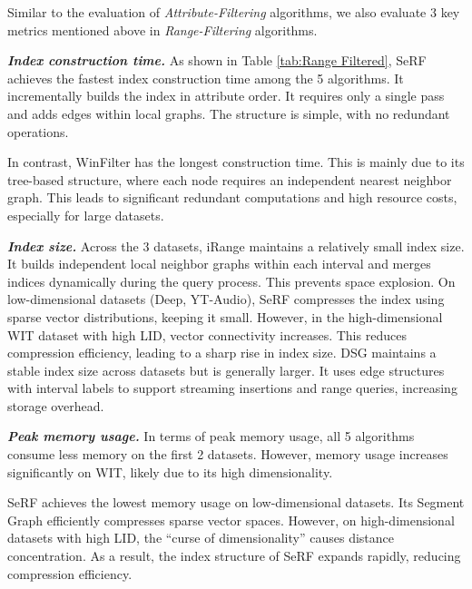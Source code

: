 \documentclass[sigconf, nonacm]{acmart}
\begin{document}
	
	Similar to the evaluation of \textit{Attribute-Filtering} algorithms, we also evaluate 3 key metrics mentioned above in \textit{Range-Filtering} algorithms.
	
	\textit{\textbf{Index construction time.}}
	As shown in Table \ref{tab:Range Filtered}, SeRF achieves the fastest index construction time among the 5 algorithms. It incrementally builds the index in attribute order. It requires only a single pass and adds edges within local graphs. The structure is simple, with no redundant operations.
	
	In contrast, WinFilter has the longest construction time. This is mainly due to its tree-based structure, where each node requires an independent nearest neighbor graph. This leads to significant redundant computations and high resource costs, especially for large datasets.
	
	
	
	
	
	
	\textit{\textbf{Index size.}} Across the 3 datasets, iRange maintains a relatively small index size. It builds independent local neighbor graphs within each interval and merges indices dynamically during the query process. This prevents space explosion. On low-dimensional datasets (Deep, YT-Audio), SeRF compresses the index using sparse vector distributions, keeping it small. However, in the high-dimensional WIT dataset with high LID, vector connectivity increases. This reduces compression efficiency, leading to a sharp rise in index size. DSG maintains a stable index size across datasets but is generally larger. It uses edge structures with interval labels to support streaming insertions and range queries, increasing storage overhead.
	
	
	\textit{\textbf{Peak memory usage.}}
	In terms of peak memory usage, all 5 algorithms consume less memory on the first 2 datasets. However, memory usage increases significantly on WIT, likely due to its high dimensionality.
	
	SeRF achieves the lowest memory usage on low-dimensional datasets. Its Segment Graph efficiently compresses sparse vector spaces. However, on high-dimensional datasets with high LID, the “curse of dimensionality” causes distance concentration. As a result, the index structure of SeRF expands rapidly, reducing compression efficiency.
	
\end{document}
